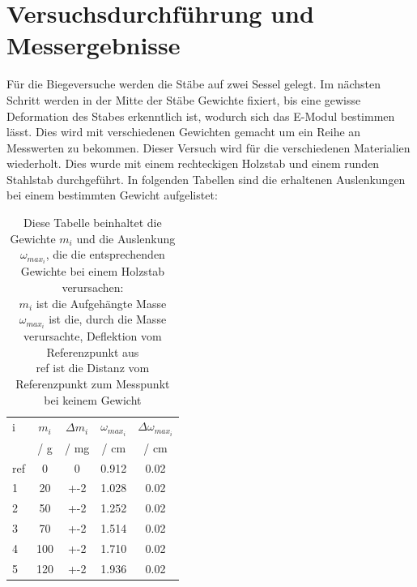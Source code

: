 \documentclass[11pt,ngerman]{scrartcl}
\begin{document}
\section{Versuchsdurchführung und Messergebnisse}
\label{sec:versuchsdurchfuehrung_messergebnisse}
Für die Biegeversuche werden die Stäbe auf zwei Sessel gelegt. Im nächsten
Schritt werden in der Mitte der Stäbe Gewichte fixiert, bis eine gewisse
Deformation des Stabes erkenntlich ist, wodurch sich das E-Modul bestimmen
lässt. Dies wird mit verschiedenen Gewichten gemacht um ein Reihe an Messwerten
zu bekommen. Dieser Versuch wird für die verschiedenen Materialien wiederholt.
Dies wurde mit einem rechteckigen Holzstab und einem runden Stahlstab durchgeführt.
In folgenden Tabellen sind die erhaltenen Auslenkungen bei einem bestimmten
Gewicht aufgelistet:

\begin{table}[H]
	\centering
	\caption{
		Diese Tabelle beinhaltet die Gewichte $m_i$ und die Auslenkung $\omega_{max_{i}}$,
		die die entsprechenden Gewichte bei einem Holzstab verursachen:\\
		$m_{i}$ ist die Aufgehängte Masse \\
		$\omega_{max_{i}}$ ist die, durch die Masse verursachte, Deflektion vom Referenzpunkt aus \\
		ref ist die Distanz vom Referenzpunkt zum Messpunkt bei keinem Gewicht \\
	}
	\label{tab:messwerte_holz}
	\begin{tabular}{l|S|S|S|S}
		i   & {$m_i$}     & {$\Delta m_i$} & $\omega_{max_{i}}$ & $\Delta \omega_{max_{i}}$ \\
		{}  & {/ \si{\g}} & {/ \si{\mg}}   & {/ \si{\cm}}       & {/ \si{\cm}}              \\ \hline \hline
		ref & 0           & 0              & 0.912              & 0.02                      \\
		1   & 20          & +-2            & 1.028              & 0.02                      \\
		2   & 50          & +-2            & 1.252              & 0.02                      \\
		3   & 70          & +-2            & 1.514              & 0.02                      \\
		4   & 100         & +-2            & 1.710              & 0.02                      \\
		5   & 120         & +-2            & 1.936              & 0.02                      \\

\end{tabular}
\end{table}
\end{document}

